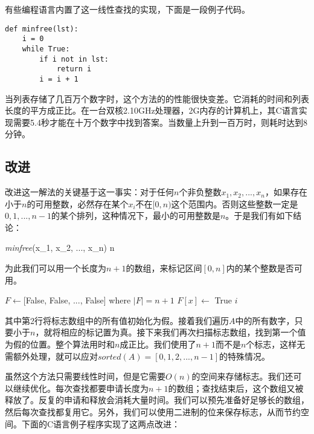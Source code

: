 \documentclass[b5paper]{ctexart}
\begin{document}
有些编程语言内置了这一线性查找的实现，下面是一段例子代码。

\lstset{language=Python, frame=single}
\begin{lstlisting}
def minfree(lst):
    i = 0
    while True:
        if i not in lst:
            return i
        i = i + 1
\end{lstlisting}

当列表存储了几百万个数字时，这个方法的的性能很快变差。它消耗的时间和列表长度的平方成正比。在一台双核2.10GHz处理器，2G内存的计算机上，其C语言实现需要5.4秒才能在十万个数字中找到答案。当数量上升到一百万时，则耗时达到8分钟。

\subsection{改进}
改进这一解法的关键基于这一事实：对于任何$n$个非负整数$x_1, x_2, ..., x_n$，如果存在小于$n$的可用整数，必然存在某个$x_i$不在$[0, n)$这个范围内。否则这些整数一定是$0, 1, ..., n - 1$的某个排列，这种情况下，最小的可用整数是$n$。于是我们有如下结论：

\be
\textit{minfree}(x_1, x_2, ..., x_n) \leq n
\label{eq:min-free}
\ee

为此我们可以用一个长度为$n + 1$的数组，来标记区间$[0, n]$内的某个整数是否可用。

\begin{algorithmic}[1]
  \State $F \gets $[False, False, ..., False] where $|F| = n+1$
      \State $F[x] \gets$ True
    \EndIf
  \EndFor
      \State \Return $i$
    \EndIf
  \EndFor
\EndFunction
\end{algorithmic}

其中第2行将标志数组中的所有值初始化为假。接着我们遍历$A$中的所有数字，只要小于$n$，就将相应的标记置为真。接下来我们再次扫描标志数组，找到第一个值为假的位置。整个算法用时和$n$成正比。我们使用了$n + 1$而不是$n$个标志，这样无需额外处理，就可以应对$sorted(A) = [0, 1, 2, ..., n-1]$的特殊情况。

虽然这个方法只需要线性时间，但是它需要$O(n)$的空间来存储标志。我们还可以继续优化。每次查找都要申请长度为$n + 1$的数组；查找结束后，这个数组又被释放了。反复的申请和释放会消耗大量时间。我们可以预先准备好足够长的数组，然后每次查找都复用它。另外，我们可以使用二进制的位来保存标志，从而节约空间。下面的C语言例子程序实现了这两点改进：
\end{document}
